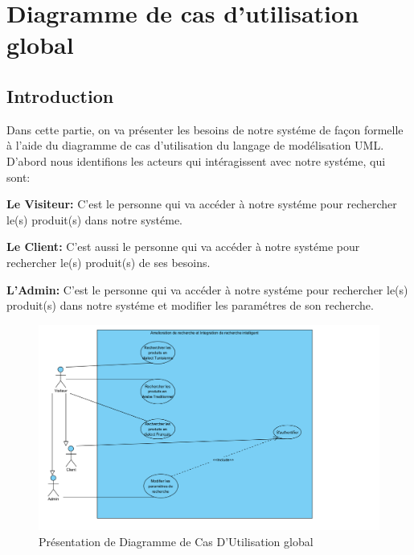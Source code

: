 \section{Diagramme de cas d’utilisation global}
\subsection{Introduction}
\noindent
Dans cette partie, on va présenter les besoins de notre systéme de façon formelle à l'aide du diagramme de cas d'utilisation du langage de modélisation UML. D'abord nous identifions les acteurs qui intéragissent avec notre systéme, qui sont:

\noindent
\small\textbf{Le Visiteur: } C'est le personne qui va accéder à notre systéme pour rechercher le(s) produit(s) dans notre systéme.

\noindent
\small\textbf{Le Client: } C'est aussi le personne qui va accéder à notre systéme pour rechercher le(s) produit(s) de ses besoins. 

\noindent
\small\textbf{L'Admin: } C'est le personne qui va accéder à notre systéme pour rechercher le(s) produit(s) dans notre systéme et modifier les paramétres de son recherche. 

\begin{figure}[H]
\centering
\includegraphics[width=1\textwidth]{logos/CU_global.png}
\caption{Présentation de Diagramme de Cas D'Utilisation global}
\label{fig:diagcuglobal}
\end{figure}